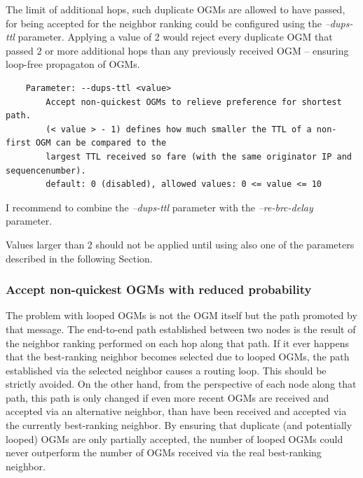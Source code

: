 \documentclass[11pt]{article}
\begin{document}
The limit of additional hops, such duplicate OGMs are allowed to have passed, for being accepted for the neighbor ranking could be configured using the \emph{--dups-ttl} parameter. 
%
Applying a value of 2 would reject every duplicate OGM that passed 2 or more additional hops than any previously received OGM -- ensuring loop-free propagaton of OGMs.
%

\begin{small}
\begin{verbatim}
    Parameter: --dups-ttl <value> 
        Accept non-quickest OGMs to relieve preference for shortest path.
        (< value > - 1) defines how much smaller the TTL of a non-first OGM can be compared to the 
        largest TTL received so fare (with the same originator IP and sequencenumber). 
        default: 0 (disabled), allowed values: 0 <= value <= 10
\end{verbatim}
\end{small}


I recommend to combine the \emph{--dups-ttl} parameter with the \emph{--re-brc-delay} parameter.

Values larger than 2 should not be applied until using also one of the parameters described in the following Section.

\subsubsection{Accept non-quickest OGMs with reduced probability}


The problem with looped OGMs is not the OGM itself but the path promoted by that message.
%
The end-to-end path established between two nodes is the result of the neighbor ranking performed on each hop along that path. 
%
If it ever happens that the best-ranking neighbor becomes selected due to looped OGMs, the path established via the selected neighbor causes a routing loop. This should be strictly avoided.
%
On the other hand, from the perspective of each node along that path, this path is only changed if even more recent OGMs are received and accepted via an alternative neighbor, than have been received and accepted via the currently best-ranking neighbor.
%
By ensuring that duplicate (and potentially looped) OGMs are only partially accepted, the number of looped OGMs could never outperform the number of OGMs received via the real best-ranking neighbor.
%
\end{document}
